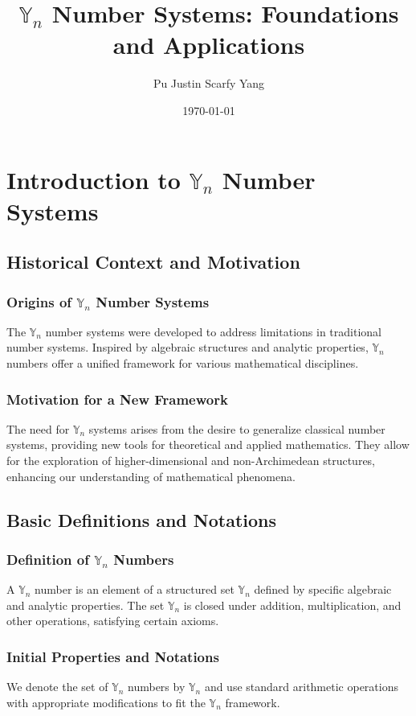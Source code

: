 \documentclass[12pt]{book}
\title{$\mathbb{Y}_n$ Number Systems: Foundations and Applications}
\author{Pu Justin Scarfy Yang}
\date{\today}
\begin{document}
\maketitle
\tableofcontents

\chapter{Introduction to $\mathbb{Y}_n$ Number Systems}
\section{Historical Context and Motivation}
\subsection{Origins of $\mathbb{Y}_n$ Number Systems}
The $\mathbb{Y}_n$ number systems were developed to address limitations in traditional number systems. Inspired by algebraic structures and analytic properties, $\mathbb{Y}_n$ numbers offer a unified framework for various mathematical disciplines.

\subsection{Motivation for a New Framework}
The need for $\mathbb{Y}_n$ systems arises from the desire to generalize classical number systems, providing new tools for theoretical and applied mathematics. They allow for the exploration of higher-dimensional and non-Archimedean structures, enhancing our understanding of mathematical phenomena.

\section{Basic Definitions and Notations}
\subsection{Definition of $\mathbb{Y}_n$ Numbers}
\begin{definition}
A $\mathbb{Y}_n$ number is an element of a structured set $\mathbb{Y}_n$ defined by specific algebraic and analytic properties. The set $\mathbb{Y}_n$ is closed under addition, multiplication, and other operations, satisfying certain axioms.
\end{definition}

\subsection{Initial Properties and Notations}
We denote the set of $\mathbb{Y}_n$ numbers by $\mathbb{Y}_n$ and use standard arithmetic operations with appropriate modifications to fit the $\mathbb{Y}_n$ framework.
\end{document}
